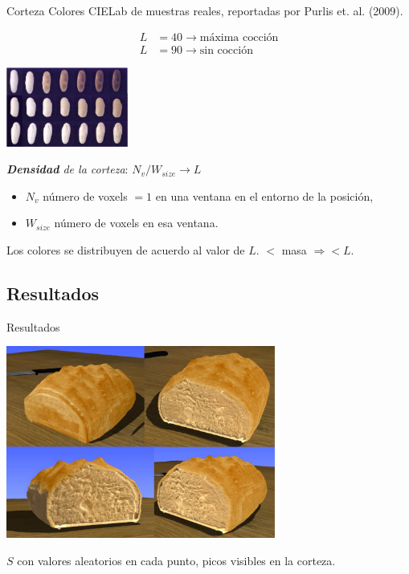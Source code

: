 \documentclass[spanish,unknownkeysallowed]{beamer}
\begin{document}
\begin{frame}{Corteza}
Colores CIELab de muestras reales, reportadas por Purlis et. al. (2009).

\begin{align*}
L &= 40 \rightarrow \text{máxima cocción}\\
L &= 90 \rightarrow \text{sin cocción}
\end{align*}

\centerline{\includegraphics[width=4cm]{../figures/browning}}





{\em \textbf{Densidad} de la corteza}: $N_{v} / W_{size} \rightarrow L$

\begin{itemize}
\item $N_{v}$ número de voxels $= 1$ en una ventana en el entorno de la posición,
\item $W_{size}$ número de voxels en esa ventana.
\end{itemize}

\vspace{0.2cm}
Los colores se distribuyen de acuerdo al valor de $L$. $<$ masa $\Rightarrow < L$.

\end{frame}


\subsection{Resultados}

\begin{frame}{Resultados}

\centerline{\includegraphics[width=9cm]{../figures/Fig11}}

$S$ con valores aleatorios en cada punto, picos visibles en la corteza.

\end{frame}
\end{document}
